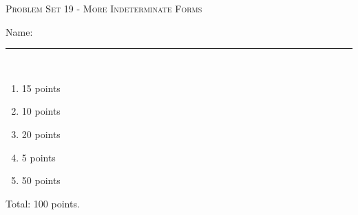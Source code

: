 \documentclass{article}
\begin{document}
\begin{center}
\large\textsc{Problem Set 19 - More Indeterminate Forms}
  
      \pspace{12pt}
  \begin{problemonly}\large Name: \rule{5cm}{0.15mm}\\ \end{problemonly}
\end{center}

\begin{grading}
\begin{enumerate}
    \item 15 points
    \item 10 points
    \item 20 points
    \item 5 points
    \item 50 points
\end{enumerate}
Total: 100 points.
\end{grading}
\end{document}
